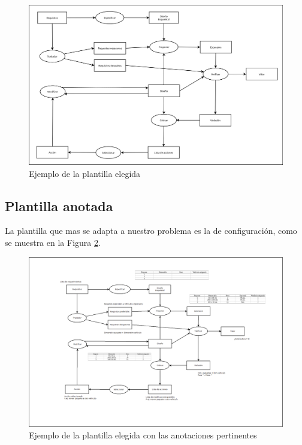 \begin{figure}[H]
  \centering
  \includegraphics[scale=0.30]{imaxes/PlantillaConfiguracion.png}
  \caption{\label{fig:PlantillaConfiguracion}Ejemplo de la plantilla elegida}
\end{figure}

\subsection{Plantilla anotada}

La plantilla que mas se adapta a nuestro problema es la de configuración, como se muestra en la Figura \ref{fig:PlantillaConfiguracionComentada}.

\begin{figure}[H]
  \centering
  \includegraphics[scale=0.286, angle=90]{imaxes/PlantillaConfiguracionComentada.png}
  \caption{\label{fig:PlantillaConfiguracionComentada}Ejemplo de la plantilla elegida con las anotaciones pertinentes}
\end{figure}

